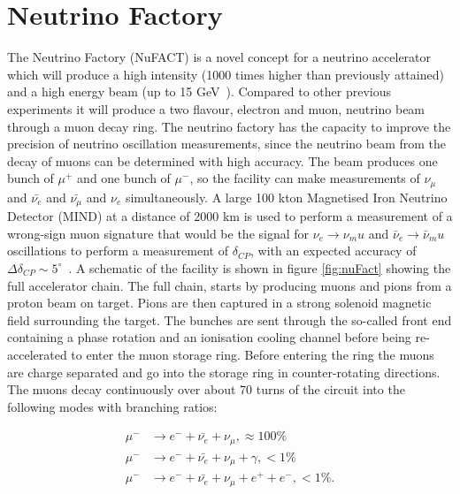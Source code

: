 \section{Neutrino Factory}\label{subsec:nuFACT}
The Neutrino Factory (NuFACT) is a novel concept for a neutrino accelerator which will produce a high intensity (1000 times higher than previously attained) and a high energy beam (up to 15 GeV~\cite{Fix7}). Compared to other previous experiments it will produce a two flavour, electron and muon, neutrino beam through a muon decay ring. The neutrino factory has the capacity to improve the precision of neutrino oscillation measurements, since the neutrino beam from the decay of muons can be determined with high accuracy. The beam produces one bunch of $\mu^+$ and one bunch of $\mu^-$, so the facility can make measurements of $\nu_{\mu}$ and $\bar{\nu_{e}}$ and $\bar{\nu_{\mu}}$ and $\nu_{e}$ simultaneously. A large 100 kton Magnetised Iron Neutrino Detector (MIND) at a distance of 2000 km is used to perform a measurement of a wrong-sign muon signature that would be the signal for $\nu_e \rightarrow \nu_mu$ and $\bar{\nu}_e \rightarrow \bar{\nu}_mu$ oscillations to perform a measurement of $\delta_{CP}$, with an expected accuracy of $\Delta \delta_{CP}\sim 5^\circ$~\cite{25NUfact}. A schematic of the facility is shown in figure \ref{fig:nuFact} showing the full accelerator chain. The full chain, starts by producing muons and pions from a proton beam on target. Pions are then captured in a strong solenoid magnetic field surrounding the target. The bunches are sent through the so-called front end containing a phase rotation and an ionisation cooling channel before being re-accelerated to enter the muon storage ring. Before entering the ring the muons are charge separated and go into the storage ring in counter-rotating directions. The muons decay continuously over about 70 turns of the circuit into the following modes with branching ratios:


\begin{align}
\mu^- &\rightarrow e^- + \bar{\nu_e} + \nu_\mu, \approx 100\% \\
\mu^- &\rightarrow e^- + \bar{\nu_e} + \nu_\mu + \gamma, <1\% \\
\mu^- &\rightarrow e^- + \bar{\nu_e} + \nu_\mu + e^+ + e^-, <1\% .
\end{align}

